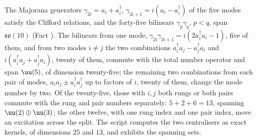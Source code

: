 The Majorana generators $\gamma_{2i} = a_{i} + a_{i}^{\dagger}$, $\gamma_{2i+1} = i(a_{i} - a_{i}^{\dagger})$ of the five modes satisfy the Clifford relations, and the forty-five bilinears $\gamma_{p}\gamma_{q}$, $p < q$, span $\mathfrak{so}(10)$ (Fact ). The bilinears from one mode, $\gamma_{2i}\gamma_{2i+1} = i(2a_{i}^{\dagger}a_{i} - 1)$, five of them, and from two modes $i \neq j$ the two combinations $a_{i}^{\dagger}a_{j} - a_{j}^{\dagger}a_{i}$ and $i(a_{i}^{\dagger}a_{j} + a_{j}^{\dagger}a_{i})$, twenty of them, commute with the total number operator and span $\uu(5)$, of dimension twenty-five; the remaining two combinations from each pair of modes, $a_{i}a_{j} \pm a_{i}^{\dagger}a_{j}^{\dagger}$ up to factors of $i$, twenty of them, change the mode number by two. Of the twenty-five, those with $i, j$ both rungs or both pairs commute with the rung and pair numbers separately: $5 + 2 + 6 = 13$, spanning $\uu(2) \oplus \uu(3)$; the other twelve, with one rung index and one pair index, move an excitation across the split. The script computes the two centralisers as exact kernels, of dimensions $25$ and $13$, and exhibits the spanning sets.
